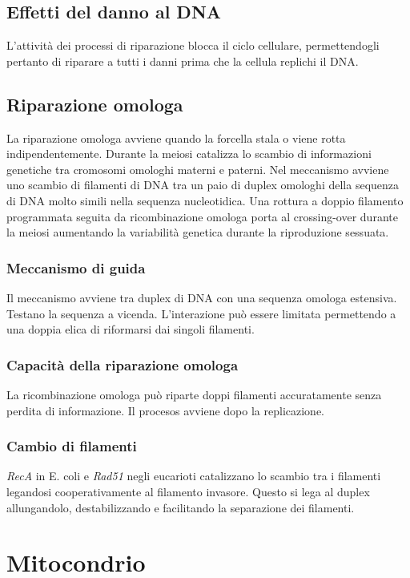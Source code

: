 	\subsection{Effetti del danno al DNA}
	L'attivit\`a dei processi di riparazione blocca il ciclo cellulare, permettendogli pertanto di riparare a tutti i danni prima che la cellula replichi il DNA.

	\subsection{Riparazione omologa}
	La riparazione omologa avviene quando la forcella stala o viene rotta indipendentemente.
	Durante la meiosi catalizza lo scambio di informazioni genetiche tra cromosomi omologhi materni e paterni.
	Nel meccanismo avviene uno scambio di filamenti di DNA tra un paio di duplex omologhi della sequenza di DNA molto simili nella sequenza nucleotidica.
	Una rottura a doppio filamento programmata seguita da ricombinazione omologa porta al crossing-over durante la meiosi aumentando la variabilit\`a genetica durante la riproduzione sessuata.

		\subsubsection{Meccanismo di guida}
		Il meccanismo avviene tra duplex di DNA con una sequenza omologa estensiva.
		Testano la sequenza a vicenda.
		L'interazione pu\`o essere limitata permettendo a una doppia elica di riformarsi dai singoli filamenti.

		\subsubsection{Capacit\`a della riparazione omologa}
		La ricombinazione omologa pu\`o riparte doppi filamenti accuratamente senza perdita di informazione.
		Il procesos avviene dopo la replicazione.

		\subsubsection{Cambio di filamenti}
		\emph{RecA} in E. coli e \emph{Rad51} negli eucarioti catalizzano lo scambio tra i filamenti legandosi cooperativamente al filamento invasore.
		Questo si lega al duplex allungandolo, destabilizzando e facilitando la separazione dei filamenti.

\section{Mitocondrio}

